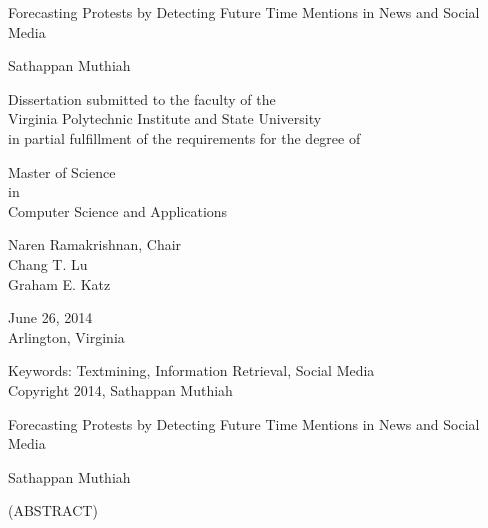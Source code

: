 \documentclass[12pt]{report}
\begin{document}
\thispagestyle{empty}

\newcommand{\then}{\Rightarrow}
\newcommand{\softor}{\operatornamewithlimits{\tilde{\vee}}}
\newcommand{\softand}{\operatornamewithlimits{\tilde{\wedge}}}
\newcommand{\softthen}{\operatornamewithlimits{\tilde{\then}}}
\newcommand{\softneg}{\operatornamewithlimits{\tilde{\neg}}}

\begin{center}

{\Large
    Forecasting Protests by Detecting Future Time Mentions in News and Social Media
}

\vfill

Sathappan Muthiah
\vfill

Dissertation submitted to the faculty of the \\
Virginia Polytechnic Institute and State University \\
in partial fulfillment of the requirements for the degree of

\vfill

Master of Science\\
in \\
Computer Science and Applications

\vfill

Naren Ramakrishnan, Chair \\
Chang T. Lu \\
Graham E. Katz \\

\vfill

June 26, 2014 \\
Arlington, Virginia

\vfill

Keywords: Textmining, Information Retrieval, Social Media
\\
Copyright 2014, Sathappan Muthiah

\end{center}

\pagebreak

\thispagestyle{empty}
\begin{center}

{\large Forecasting Protests by Detecting Future Time Mentions in News and Social Media
}

\vfill

Sathappan Muthiah

\vfill

(ABSTRACT)

\vfill

\end{center}
\end{document}
